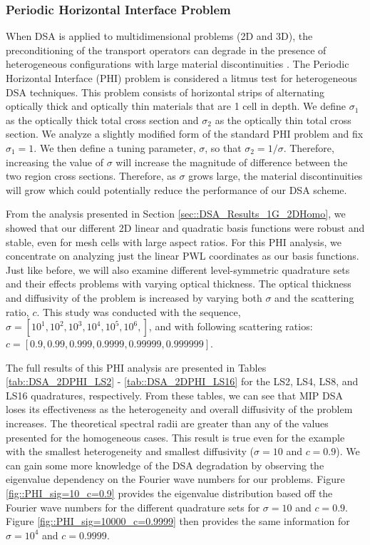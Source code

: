 \subsubsection{Periodic Horizontal Interface Problem}
\label{sec::DSA_Results_1G_PHI}

When DSA is applied to multidimensional problems (2D and 3D), the preconditioning of the transport operators can degrade in the presence of heterogeneous configurations with large material discontinuities \cite{azmy2002unconditionally}. The Periodic Horizontal Interface (PHI) problem is considered a litmus test for heterogeneous DSA techniques. This problem consists of horizontal strips of alternating optically thick and optically thin materials that are 1 cell in depth. We define $\sigma_1$ as the optically thick total cross section and $\sigma_2$ as the optically thin total cross section. We analyze a slightly modified form of the standard PHI problem and fix $\sigma_1 = 1$. We then define a tuning parameter, $\sigma$, so that $\sigma_2=1 / \sigma$. Therefore, increasing the value of $\sigma$ will increase the magnitude of difference between the two region cross sections. Therefore, as $\sigma$ grows large, the material discontinuities will grow which could potentially reduce the performance of our DSA scheme.

From the analysis presented in Section \ref{sec::DSA_Results_1G_2DHomo}, we showed that our different 2D linear and quadratic basis functions were robust and stable, even for mesh cells with large aspect ratios. For this PHI analysis, we concentrate on analyzing just the linear PWL coordinates as our basis functions. Just like before, we will also examine different level-symmetric quadrature sets and their effects problems with varying optical thickness. The optical thickness and diffusivity of the problem is increased by varying both $\sigma$ and the scattering ratio, $c$. This study was conducted with the sequence, $\sigma = \left[ 10^1, 10^2, 10^3, 10^4, 10^5, 10^6,  \right]$, and with following scattering ratios: $c = \left[ 0.9,0.99,0.999,0.9999,0.99999,0.999999  \right]$.

The full results of this PHI analysis are presented in Tables \ref{tab::DSA_2DPHI_LS2} - \ref{tab::DSA_2DPHI_LS16} for the LS2, LS4, LS8, and LS16 quadratures, respectively. From these tables, we can see that MIP DSA loses its effectiveness as the heterogeneity and overall diffusivity of the problem increases. The theoretical spectral radii are greater than any of the values presented for the homogeneous cases. This result is true even for the example with the smallest heterogeneity and smallest diffusivity ($\sigma=10$ and $c=0.9$). We can gain some more knowledge of the DSA degradation by observing the eigenvalue dependency on the Fourier wave numbers for our problems. Figure \ref{fig::PHI_sig=10_c=0.9} provides the eigenvalue distribution based off the Fourier wave numbers for the different quadrature sets for $\sigma=10$ and $c=0.9$. Figure \ref{fig::PHI_sig=10000_c=0.9999} then provides the same information for $\sigma=10^4$ and $c=0.9999$.

